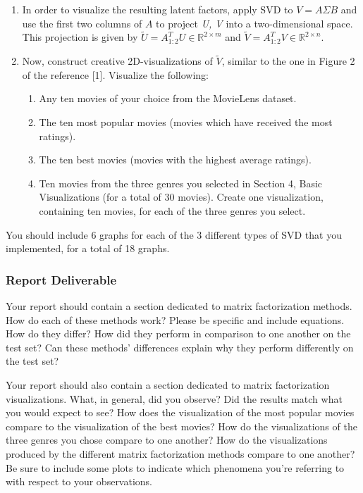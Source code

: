 \begin{enumerate}
	\item In order to visualize the resulting latent factors, apply SVD to $V = A \Sigma B$ and use the first two columns of $A$ to project \textit{U, V} into a two-dimensional space. This projection is given by $\tilde{U} = A_{1:2}^TU \in \mathbb{R}^{2 \times m}$ and $\tilde{V} = A_{1:2}^TV \in \mathbb{R}^{2 \times n}$.
	\item Now, construct creative 2D-visualizations of $\tilde{V}$, similar to the one in Figure 2 of the reference [1]. Visualize the following:		\begin{enumerate}
		\item Any ten movies of your choice from the MovieLens dataset.
		\item The ten most popular movies (movies which have received the most ratings).
		\item The ten best movies (movies with the highest average ratings).
		\item Ten movies from the three genres you selected in Section 4, Basic Visualizations (for a total of 30 movies). Create one visualization, containing ten movies, for each of the three genres you select.
	\end{enumerate}
\end{enumerate}

You should include 6 graphs for each of the 3 different types of SVD that you implemented, for a total of 18 graphs.


\subsubsection{Report Deliverable}
Your report should contain a section dedicated to matrix factorization methods. How do each of these methods work? Please be specific and include equations. How do they differ? How did they perform in comparison to one another on the test set? Can these methods' differences explain why they perform differently on the test set?

Your report should also contain a section dedicated to matrix factorization visualizations. What, in general, did you observe? Did the results match what you would expect to see? How does the visualization of the most popular movies compare to the visualization of the best movies? How do the visualizations of the three genres you chose compare to one another? How do the visualizations produced by the different matrix factorization methods compare to one another? Be sure to include some plots to indicate which phenomena you’re referring to with respect to your observations.

